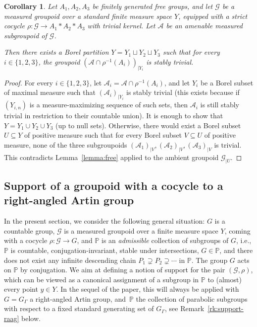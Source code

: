 \documentclass[11pt]{article}
\newcommand{\ie}{i.e.,\xspace}
\newcommand{\Subsection}{\subsection}
\numberwithin{equation}{section}
\let\mathcal\mathscr
\theoremstyle{plain}
\newtheorem{cor}[theo]{Corollary}
\theoremstyle{definition}
\let\dunion\sqcup
\newcommand{\cala}{\mathcal{A}}
\newcommand{\calg}{\mathcal{G}}
\begin{document}
\begin{cor}\label{cor:free-2}
Let $A_1,A_2,A_3$ be finitely generated free groups, and let $\calg$ be a measured groupoid over a standard finite measure space $Y$, equipped with a strict cocycle $\rho:\calg\to A_1\ast A_2\ast A_3$ with trivial kernel. Let $\cala$ be an amenable measured subgroupoid of $\calg$.

Then there exists a Borel partition $Y=Y_1\dunion Y_2\dunion Y_3$ such that for every $i\in\{1,2,3\}$, the groupoid $(\cala\cap\rho^{-1}(A_i))_{|Y_i}$ is stably trivial.
\end{cor}

\begin{proof}
For every $i\in\{1,2,3\}$, let $\cala_i=\cala\cap\rho^{-1}(A_i)$, and let $Y_i$ be a Borel subset of maximal measure such that $(\cala_i)_{|Y_i}$ is stably trivial (this exists because if $(Y_{i,n})$ is a measure-maximizing sequence of such sets, then $\cala_i$ is still stably trivial in restriction to their countable union). It is enough to show that $Y=Y_1\cup Y_2\cup Y_3$ (up to null sets). Otherwise, there would exist a Borel subset $U\subseteq Y$ of positive measure such that for every Borel subset $V\subseteq U$ of positive measure, none of the three subgroupoids $(\cala_1)_{|V},(\cala_2)_{|V},(\cala_3)_{|V}$ is trivial. This contradicts Lemma~\ref{lemma:free} applied to the ambient groupoid $\calg_{|U}$.
\end{proof}

\Subsection{Support of a groupoid with a cocycle to a right-angled Artin group}

In the present section, we consider the following general situation: $G$ is a countable group, $\calg$ is a measured groupoid over a finite measure space $Y$, coming with a cocycle $\rho:\calg\to G$, and $\mathbb{P}$ is an \emph{admissible} collection of subgroups of $G$, \ie $\mathbb{P}$ is countable, conjugation-invariant, stable under intersections, $G\in \mathbb {P}$, and there does not exist any infinite descending chain $P_1\supsetneq P_2\supsetneq\cdots$ in $\mathbb{P}$. The group $G$ acts on $\mathbb{P}$ by conjugation. We aim at defining a notion of support for the pair $(\calg,\rho)$, which can be viewed as a canonical assignment of a subgroup in $\mathbb{P}$ to (almost) every point $y\in Y$. In the sequel of the paper, this will always be applied with $G=G_\Gamma$ a right-angled Artin group, and~$\mathbb{P}$ the collection of parabolic subgroups with respect to a fixed standard generating set of $G_\Gamma$, see Remark~\ref{rk:support-raag} below.
\end{document}
